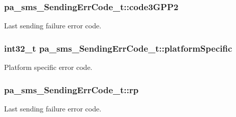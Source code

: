 \subsubsection[{\texorpdfstring{code3\+G\+P\+P2}{code3GPP2}}]{ pa\+\_\+sms\+\_\+\+Sending\+Err\+Code\+\_\+t\+::code3\+G\+P\+P2}\hypertarget{structpa__sms___sending_err_code__t_ae17206b9bab4f574b27748c39e710f5a}{}\label{structpa__sms___sending_err_code__t_ae17206b9bab4f574b27748c39e710f5a}


Last sending failure error code. 

\subsubsection[{\texorpdfstring{platform\+Specific}{platformSpecific}}]{\setlength{\rightskip}{0pt plus 5cm}int32\+\_\+t pa\+\_\+sms\+\_\+\+Sending\+Err\+Code\+\_\+t\+::platform\+Specific}\hypertarget{structpa__sms___sending_err_code__t_aa466cba7b72e5626991891534518f0a0}{}\label{structpa__sms___sending_err_code__t_aa466cba7b72e5626991891534518f0a0}


Platform specific error code. 

\subsubsection[{\texorpdfstring{rp}{rp}}]{ pa\+\_\+sms\+\_\+\+Sending\+Err\+Code\+\_\+t\+::rp}\hypertarget{structpa__sms___sending_err_code__t_ad9b7facca93bb5203b5e21f777b5ff15}{}\label{structpa__sms___sending_err_code__t_ad9b7facca93bb5203b5e21f777b5ff15}


Last sending failure error code. 

